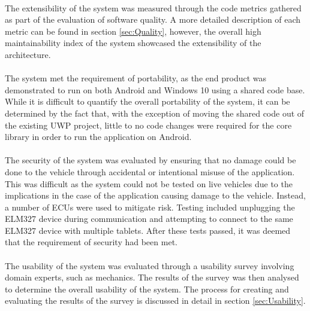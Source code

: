 	\paragraph{}{
	The extensibility of the system was measured through the code metrics gathered as part of the evaluation of software quality. A more detailed description of each metric can be found in section \ref{sec:Quality}, however, the overall high maintainability index of the system showcased the extensibility of the architecture.
	}
	\paragraph{}{
	The system met the requirement of portability, as the end product was demonstrated to run on both Android and Windows 10 using a shared code base. While it is difficult to quantify the overall portability of the system, it can be determined by the fact that, with the exception of moving the shared code out of the existing UWP project, little to no code changes were required for the core library in order to run the application on Android.
	}
	\paragraph{}{
	The security of the system was evaluated by ensuring that no damage could be done to the vehicle through accidental or intentional misuse of the application. This was difficult as the system could not be tested on live vehicles due to the implications in the case of the application causing damage to the vehicle. Instead, a number of ECUs were used to mitigate risk. Testing included unplugging the ELM327 device during communication and attempting to connect to the same ELM327 device with multiple tablets. After these tests passed, it was deemed that the requirement of security had been met.
	}
	\paragraph{}{
	The usability of the system was evaluated through a usability survey involving domain experts, such as mechanics. The results of the survey was then analysed to determine the overall usability of the system. The process for creating and evaluating the results of the survey is discussed in detail in section \ref{sec:Usability}.
	}
	
